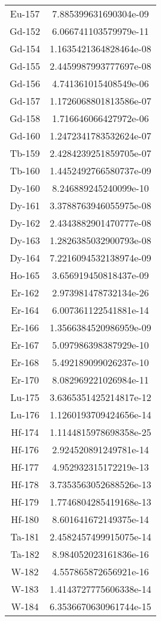 \begin{table}[h!]
\begin{tabular}{|| c || c |}
Eu-157 &  7.885399631690304e-09 \\
Gd-152 &  6.066741103579979e-11 \\
Gd-154 &  1.1635421364828464e-08 \\
Gd-155 &  2.4459987993777697e-08 \\
Gd-156 &  4.741361015408549e-06 \\
Gd-157 &  1.1726068801813586e-07 \\
Gd-158 &  1.716646066427972e-06 \\
Gd-160 &  1.2472341783532624e-07 \\
Tb-159 &  2.4284239251859705e-07 \\
Tb-160 &  1.4452492766580737e-09 \\
Dy-160 &  8.246889245240099e-10 \\
Dy-161 &  3.3788763946055975e-08 \\
Dy-162 &  2.4343882901470777e-08 \\
Dy-163 &  1.2826385032900793e-08 \\
Dy-164 &  7.2216094532138974e-09 \\
Ho-165 &  3.656919450818437e-09 \\
Er-162 &  2.973981478732134e-26 \\
Er-164 &  6.007361122541881e-14 \\
Er-166 &  1.3566384520986959e-09 \\
Er-167 &  5.097986398387929e-10 \\
Er-168 &  5.492189099026237e-10 \\
Er-170 &  8.082969221026984e-11 \\
Lu-175 &  3.6365351425214817e-12 \\
Lu-176 &  1.1260193709424656e-14 \\
Hf-174 &  1.1144815978698358e-25 \\
Hf-176 &  2.924520891249781e-14 \\
Hf-177 &  4.952932315172219e-13 \\
Hf-178 &  3.7353563052688526e-13 \\
Hf-179 &  1.7746804285419168e-13 \\
Hf-180 &  8.601641672149375e-14 \\
Ta-181 &  2.4582457499915075e-14 \\
Ta-182 &  8.984052023161836e-16 \\
W-182 &  4.557865872656921e-16 \\
W-183 &  1.4143727775606338e-14 \\
W-184 &  6.3536670630961744e-15 \\

\end{tabular}
\end{table}
